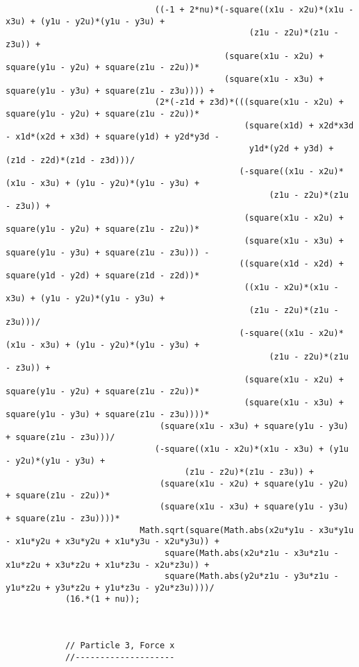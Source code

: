 \begin{lstlisting}
							  ((-1 + 2*nu)*(-square((x1u - x2u)*(x1u - x3u) + (y1u - y2u)*(y1u - y3u) + 
												 (z1u - z2u)*(z1u - z3u)) + 
											(square(x1u - x2u) + square(y1u - y2u) + square(z1u - z2u))*
											(square(x1u - x3u) + square(y1u - y3u) + square(z1u - z3u)))) + 
							  (2*(-z1d + z3d)*(((square(x1u - x2u) + square(y1u - y2u) + square(z1u - z2u))*
												(square(x1d) + x2d*x3d - x1d*(x2d + x3d) + square(y1d) + y2d*y3d - 
												 y1d*(y2d + y3d) + (z1d - z2d)*(z1d - z3d)))/
											   (-square((x1u - x2u)*(x1u - x3u) + (y1u - y2u)*(y1u - y3u) + 
													 (z1u - z2u)*(z1u - z3u)) + 
												(square(x1u - x2u) + square(y1u - y2u) + square(z1u - z2u))*
												(square(x1u - x3u) + square(y1u - y3u) + square(z1u - z3u))) - 
											   ((square(x1d - x2d) + square(y1d - y2d) + square(z1d - z2d))*
												((x1u - x2u)*(x1u - x3u) + (y1u - y2u)*(y1u - y3u) + 
												 (z1u - z2u)*(z1u - z3u)))/
											   (-square((x1u - x2u)*(x1u - x3u) + (y1u - y2u)*(y1u - y3u) + 
													 (z1u - z2u)*(z1u - z3u)) + 
												(square(x1u - x2u) + square(y1u - y2u) + square(z1u - z2u))*
												(square(x1u - x3u) + square(y1u - y3u) + square(z1u - z3u))))*
							   (square(x1u - x3u) + square(y1u - y3u) + square(z1u - z3u)))/
							  (-square((x1u - x2u)*(x1u - x3u) + (y1u - y2u)*(y1u - y3u) + 
									(z1u - z2u)*(z1u - z3u)) + 
							   (square(x1u - x2u) + square(y1u - y2u) + square(z1u - z2u))*
							   (square(x1u - x3u) + square(y1u - y3u) + square(z1u - z3u))))*
						   Math.sqrt(square(Math.abs(x2u*y1u - x3u*y1u - x1u*y2u + x3u*y2u + x1u*y3u - x2u*y3u)) + 
								square(Math.abs(x2u*z1u - x3u*z1u - x1u*z2u + x3u*z2u + x1u*z3u - x2u*z3u)) + 
								square(Math.abs(y2u*z1u - y3u*z1u - y1u*z2u + y3u*z2u + y1u*z3u - y2u*z3u))))/
			(16.*(1 + nu));
			
			
			
			// Particle 3, Force x
			//--------------------
			

\end{lstlisting}
